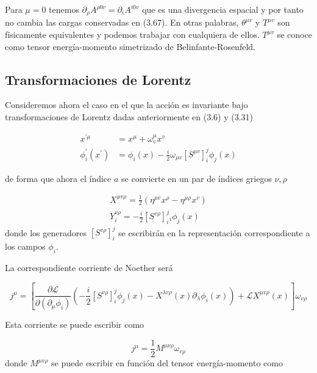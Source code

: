 Para $\mu=0$ tenemos $\partial_{\rho} A^{\rho 0 v}=\partial_{i} A^{i 0 v}$ que es una divergencia espacial y por tanto no cambia las cargas conservadas en (3.67). En otras palabras, $\theta^{\mu v}$ y $T^{\mu v}$ son físicamente equivalentes y podemos trabajar con cualquiera de ellos. $T^{\mu v}$ se conoce como tensor energía-momento simetrizado de Belinfante-Rosenfeld.
\subsection{Transformaciones de Lorentz}
Consideremos ahora el caso en el que la acción es invariante bajo transformaciones de Lorentz dadas anteriormente en (3.6) y (3.31)

\[\begin{aligned}
  x^{\prime \mu} & =x^{\mu}+\omega_{v}^{\mu} x^{v} \\
  \phi_{i}^{\prime}\left(x^{\prime}\right) & =\phi_{i}(x)-\frac{i}{2} \omega_{\mu v}\left[S^{\mu v}\right]_{i}^{j} \phi_{j}(x) \tag{3.69}
  \end{aligned}\]

de forma que ahora el índice $a$ se convierte en un par de índices griegos $\nu , \rho$

\begin{gather*}
X^{\mu v \rho}=\frac{1}{2}\left(\eta^{\mu v} x^{\rho}-\eta^{\mu \rho} x^{v}\right) \\
Y_{i}^{v \rho}=-\frac{i}{2}\left[S^{v \rho}\right]_{i}^{j}{ }_{i} \phi_{j}(x) \tag{3.70}
\end{gather*}
donde los generadores $\left[S^{v \rho}\right]_{i}^{j}$ se escribirán en la representación correspondiente a los campos $\phi_{i}$.

La correspondiente corriente de Noether será

\begin{equation*}
j^{\mu}=\left[\frac{\partial \mathscr{L}}{\partial\left(\partial_{\mu} \phi_{i}\right)}\left(-\frac{i}{2}\left[S^{v \rho}\right]_{i}^{j} \phi_{j}(x)-X^{\lambda v \rho}(x) \partial_{\lambda} \phi_{i}(x)\right)+\mathscr{L} X^{\mu v \rho}(x)\right] \omega_{v \rho} \tag{3.71}
\end{equation*}

Esta corriente se puede escribir como

\begin{equation*}
j^{\mu}=\frac{1}{2} M^{\mu \nu \rho} \omega_{v \rho} \tag{3.72}
\end{equation*}
donde $M^{\mu v \rho}$ se puede escribir en función del tensor energía-momento como

